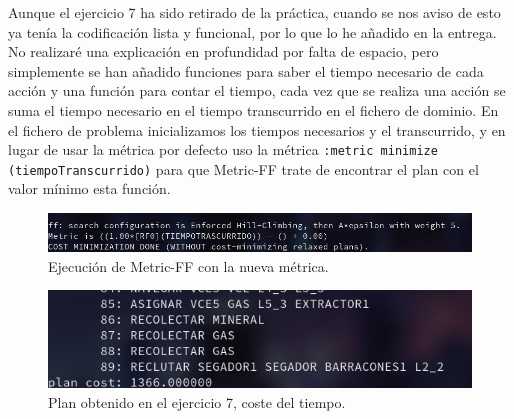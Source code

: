 \documentclass[10pt, spanish]{article}
\begin{document}
Aunque el ejercicio 7 ha sido retirado de la práctica, cuando se nos aviso de esto ya tenía la codificación lista y funcional, por lo que lo he añadido en la entrega. No realizaré una explicación en profundidad por falta de espacio, pero simplemente se han añadido funciones para saber el tiempo necesario de cada acción y una función para contar el tiempo, cada vez que se realiza una acción se suma el tiempo necesario en el tiempo transcurrido en el fichero de dominio. En el fichero de problema inicializamos los tiempos necesarios y el transcurrido, y en lugar de usar la métrica por defecto uso la métrica \texttt{:metric minimize (tiempoTranscurrido)} para que Metric-FF trate de encontrar el plan con el valor mínimo esta función.


\begin{figure}[H]
	\centering
	\includegraphics[scale=0.3]{usoMetrica.png}
	\caption{Ejecución de Metric-FF con la nueva métrica.}
	\label{plan7me}
\end{figure}

\begin{figure}[H]
	\centering
	\includegraphics[scale=0.3]{plan7.png}
	\caption{Plan obtenido en el ejercicio 7, coste del tiempo.}
	\label{plan7}
\end{figure}
\end{document}

